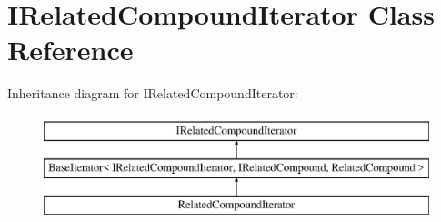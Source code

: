 \hypertarget{class_i_related_compound_iterator}{}\section{I\+Related\+Compound\+Iterator Class Reference}
\label{class_i_related_compound_iterator}
Inheritance diagram for I\+Related\+Compound\+Iterator\+:\begin{figure}[H]
\begin{center}
\leavevmode
\includegraphics[height=3.000000cm]{class_i_related_compound_iterator}
\end{center}
\end{figure}
